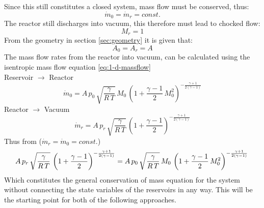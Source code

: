 	\noindent Since this still constitutes a closed system, mass flow must be conserved, thus:
	$$
		\dot{m}_0 = \dot{m}_r = const.
	$$
	The reactor still discharges into vacuum, this therefore must lead to chocked flow:
	$$
		M_r = 1
	$$
	From the geometry in section \ref{sec:geometry} it is given that:
	$$
		A_0 = A_r = A
	$$
	The mass flow rates from the reactor into vacuum, can be calculated using the isentropic mass flow equation \eqref{eq:1-d-massflow}\\
	Reservoir $\to$ Reactor
	\begin{equation}
		\dot{m}_0 = A\, p_0\, \sqrt{\frac{\gamma}{R\,T}}\, M_0\,\left(1+\frac{\gamma-1}{2}\,M_0^2\right)^{-\frac{\gamma+1}{2(\gamma-1)}}
		\label{eq:massflow-inlet}
	\end{equation}
	Reactor $\to$ Vacuum
	\begin{equation}
		\dot{m}_r = A\, p_r\, \sqrt{\frac{\gamma}{R\,T}}\,\left(1+\frac{\gamma-1}{2}\right)^{-\frac{\gamma+1}{2(\gamma-1)}}
		\label{eq:massflow-outlet}
	\end{equation}
	Thus from ($\dot{m}_r = \dot{m}_0 = const.$)
	$$
		A\, p_r\, \sqrt{\frac{\gamma}{R\,T}}\,\left(1+\frac{\gamma-1}{2}\right)^{-\frac{\gamma+1}{2(\gamma-1)}}
		=  A\, p_0\, \sqrt{\frac{\gamma}{R\,T}}\, M_0\,\left(1+\frac{\gamma-1}{2}\,M_0^2\right)^{-\frac{\gamma+1}{2(\gamma-1)}}\\\\
	$$
	Which constitutes the general conservation of mass equation for the system without connecting the state variables of the reservoirs in any way.
	This will be the starting point for both of the following approaches.\\
	\newpage
